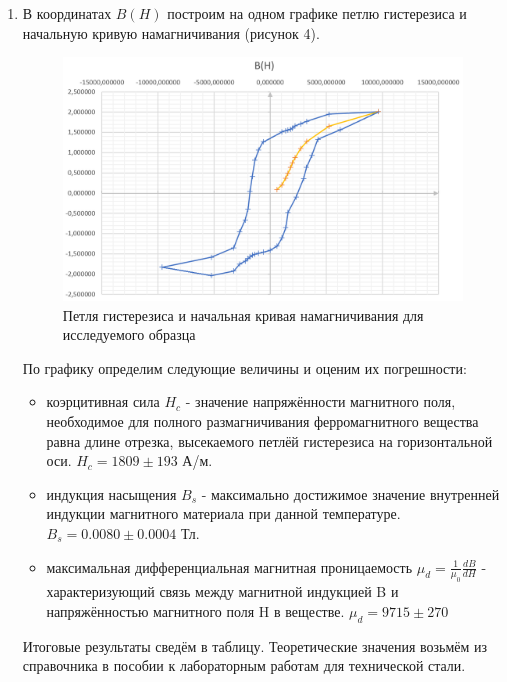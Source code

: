 \documentclass[a4paper]{article}
\begin{document}
\begin{enumerate}
\begin{table}[h]
\begin{tabular}{ |p{1.2cm}||p{1cm}|p{1cm}|p{1cm}|p{1cm}|p{1cm}|p{1cm}|p{1cm}|p{1cm}|p{1cm}|p{1cm}|p{1cm}|p{1cm}| }
    \end{tabular}
\end{table}

\item В координатах $B(H)$ построим на одном графике петлю гистерезиса и начальную кривую намагничивания (рисунок 4).

\begin{figure}[h]
    \centering
    \includegraphics[width=\textwidth]{B(H).PNG}
    \caption{Петля гистерезиса и начальная кривая намагничивания для исследуемого образца}
    \label{fig:vac}
\end{figure}

По графику определим следующие величины и оценим их погрешности:
\begin{itemize}
    \item коэрцитивная сила $H_c$ - значение напряжённости магнитного поля, необходимое для полного размагничивания ферромагнитного вещества равна длине отрезка, высекаемого петлёй гистерезиса на горизонтальной оси. $H_c = 1809 \pm 193$ А/м.
    \item индукция насыщения $B_s$ -  максимально достижимое значение внутренней индукции магнитного материала при данной температуре. $B_s = 0.0080 \pm 0.0004$ Тл.
    \item максимальная дифференциальная магнитная проницаемость $\mu_d = \frac{1}{\mu_0}\frac{dB}{dH}$ - характеризующий связь между магнитной индукцией B и напряжённостью магнитного поля H в веществе. $\mu_d = 9715 \pm 270$
\end{itemize}

Итоговые результаты сведём в таблицу. Теоретические значения возьмём из справочника в пособии к лабораторным работам для технической стали.


\end{enumerate}
\end{document}
